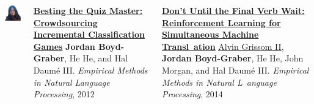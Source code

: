 \documentclass[compress]{beamer}
\begin{document}
\begin{frame}{}

  \begin{columns}
        \includegraphics[width=0.9\linewidth]{general_figures/hehe}
        \begin{block}{{\bf \href{http://cs.colorado.edu/~jbg//docs/qb_emnlp_2012.pdf}{Besting the Quiz Master: Crowdsourcing Incremental Classification Games}}}
          {\bf Jordan Boyd-Graber}, He He, and Hal {Daum\'{e} III}. \emph{Empirical Methods in Natural Language Processing}, 2012
        \end{block}
        
\begin{block}{ {\bf \href{http://cs.colorado.edu/~jbg//docs/2014_emnlp_simtrans.pdf}{Don't Until the Final Verb Wait: Reinforcement Learning for Simultaneous Machine Transl\
ation}}}
\underline{\href{http://www.umiacs.umd.edu/~alvin/}{Alvin Grissom II}}, {\bf Jordan Boyd-Graber}, He He, John Morgan, and Hal {Daum\'{e} III}.  \emph{Empirical Methods in Natural L\
anguage Processing}, 2014
        \end{block}        
  \end{columns}
\end{frame}
\end{document}
